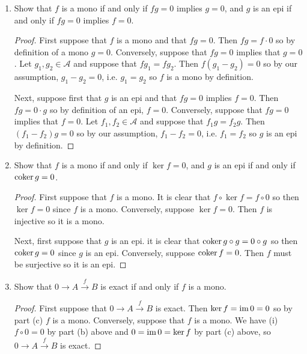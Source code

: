 \documentclass[11pt,oneside,english]{amsart}
\theoremstyle{definition}
\newcommand{\MC}[1]{\mathcal{#1}}
\newcommand{\im}{\text{im\,}}
\newcommand{\coker}{\text{coker\,}}
\begin{document}
\begin{enumerate}[leftmargin=*]
\begin{enumerate}
\begin{proof}
By definition $\ker(x \xrightarrow{0} y)$ is an arrow $k \xrightarrow{i} x$ such that $k \xrightarrow{i} x\xrightarrow{0}y$ is 0, but this is clearly the identity $1_x$ since $1_x\circ 0=0$. Similarly, $\coker(x \xrightarrow{0} y) = 1_y$ since $0\circ 1_y=0$. Next, by definition $\im(x \xrightarrow{0} y)\coloneqq\ker(\coker (x \xrightarrow{0} y))=\ker(x\xrightarrow{1_y} y)=0\to y$.
\end{proof}

\item Show that $f$ is a mono if and only if $fg = 0$ implies $g = 0$, and $g$ is an epi if and only if $fg = 0$ implies $f = 0$.

\begin{proof}
First suppose that $f$ is a mono and that $fg=0$. Then $fg=f\cdot0$ so by definition of a mono $g=0$. Conversely, suppose that $fg=0$ implies that $g=0$. Let $g_1,g_2\in\MC{A}$ and suppose that $fg_1=fg_2$. Then $f(g_1-g_2)=0$ so by our assumption, $g_1-g_2=0$, i.e. $g_1=g_2$ so $f$ is a mono by definition.

Next, suppose first that $g$ is an epi and that $fg=0$ implies $f=0$. Then $fg=0\cdot g$ so by definition of an epi, $f=0$. Conversely, suppose that $fg=0$ implies that $f=0$. Let $f_1,f_2\in\MC{A}$ and suppose that $f_1g=f_2g$. Then $(f_1-f_2)g=0$ so by our assumption, $f_1-f_2=0$, i.e. $f_1=f_2$ so $g$ is an epi by definition.
\end{proof}

\item Show that $f$ is a mono if and only if $\ker f = 0$, and $g$ is an epi if and only if $\coker g = 0$.

\begin{proof}
First suppose that $f$ is a mono. It is clear that $f\circ\ker f=f\circ 0$ so then $\ker f=0$ since $f$ is a mono. Conversely, suppose $\ker f=0$. Then $f$ is injective so it is a mono.

Next, first suppose that $g$ is an epi. it is clear that $\coker g\circ g=0\circ g$ so then $\coker g=0$ since $g$ is an epi. Conversely, suppose $\coker f=0$. Then $f$ must be surjective so it is an epi.
\end{proof}

\item Show that $0 \longrightarrow A \xrightarrow{\, f \,} B$ is exact if and only if $f$ is a mono.

\begin{proof}
First suppose that $0 \longrightarrow A \xrightarrow{\, f \,} B$ is exact. Then $\ker f=\im 0=0$ so by part (c) $f$ is a mono. Conversely, suppose that $f$ is a mono. We have (i) $f\circ 0=0$ by part (b) above and $0=\im0=\ker f$ by part (c) above, so $0 \longrightarrow A \xrightarrow{\, f \,} B$ is exact.
\end{proof}


\end{enumerate}
\end{enumerate}
\end{document}
